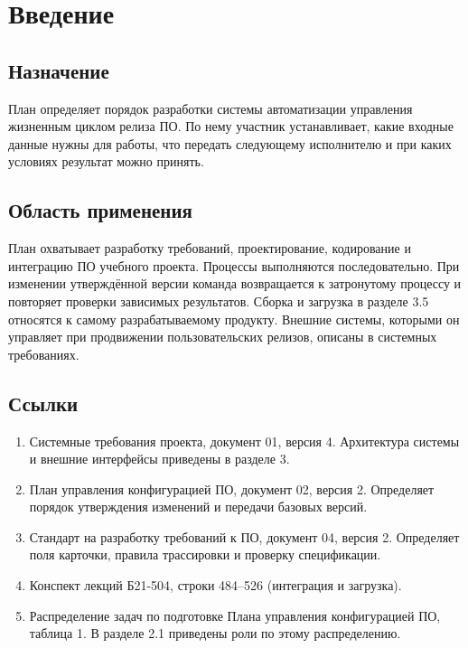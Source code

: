 \documentclass{tpks}
\begin{document}
\makeheader
\begin{changelog}
\end{changelog}

\section{Введение}
\subsection{Назначение}
План определяет порядок разработки системы автоматизации управления жизненным циклом релиза ПО. По нему участник устанавливает, какие входные данные нужны для работы, что передать следующему исполнителю и при каких условиях результат можно принять.

\subsection{Область применения}
План охватывает разработку требований, проектирование, кодирование и интеграцию ПО учебного проекта. Процессы выполняются последовательно. При изменении утверждённой версии команда возвращается к затронутому процессу и повторяет проверки зависимых результатов. Сборка и загрузка в разделе 3.5 относятся к самому разрабатываемому продукту. Внешние системы, которыми он управляет при продвижении пользовательских релизов, описаны в системных требованиях.

\subsection{Ссылки}
\begin{enumerate}
\item Системные требования проекта, документ 01, версия 4. Архитектура системы и внешние интерфейсы приведены в разделе 3.
\item План управления конфигурацией ПО, документ 02, версия 2. Определяет порядок утверждения изменений и передачи базовых версий.
\item Стандарт на разработку требований к ПО, документ 04, версия 2. Определяет поля карточки, правила трассировки и проверку спецификации.
\item Конспект лекций Б21-504, строки 484--526 (интеграция и загрузка).
\item Распределение задач по подготовке Плана управления конфигурацией ПО, таблица 1. В разделе 2.1 приведены роли по этому распределению.
\end{enumerate}
\end{document}
